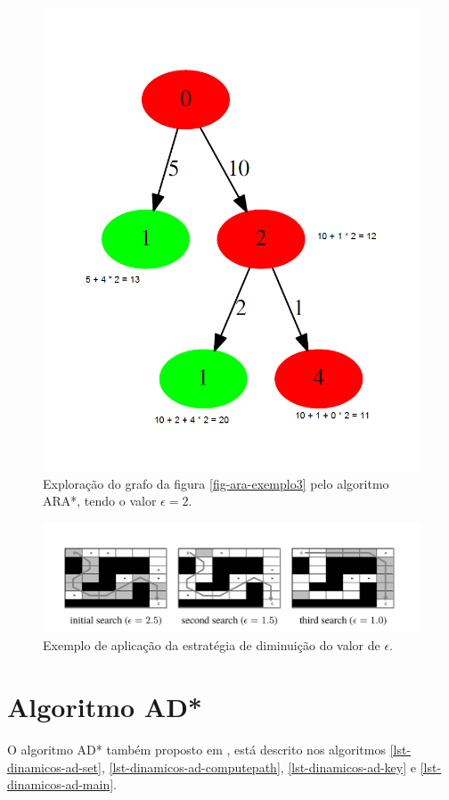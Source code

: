 \begin{figure}[H]
\centering
\includegraphics[width=.70\textwidth]{figuras/ARA-exemplo2} 
\caption{Exploração do grafo da figura \ref{fig-ara-exemplo3} pelo algoritmo ARA*, tendo o valor $\epsilon = 2$.}
\label{fig-ara-exemplo2}
\end{figure}

\begin{figure}[H]
\centering
\includegraphics[width=.80\textwidth]{figuras/ara-3} 
\caption{Exemplo de aplicação da estratégia de diminuição do valor de $\epsilon$.}
\label{fig-ara-exemplo}
\end{figure}



\section{Algoritmo AD*}
\label{sec-dinamicos-ad}

O algoritmo AD* também proposto em , está descrito nos algoritmos \ref{lst-dinamicos-ad-set}, \ref{lst-dinamicos-ad-computepath}, \ref{lst-dinamicos-ad-key} e \ref{lst-dinamicos-ad-main}.

